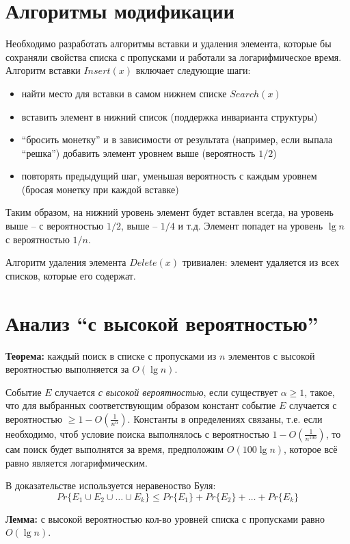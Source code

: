 \documentclass[11pt]{article}
\begin{document}
\section{Алгоритмы модификации}
Необходимо разработать алгоритмы вставки и удаления элемента, которые бы сохраняли свойства списка с пропусками и работали за логарифмическое время. Алгоритм вставки $Insert(x)$ включает следующие шаги:
\begin{itemize}
\item найти место для вставки в самом нижнем списке $Search(x)$
\item вставить элемент в нижний список (поддержка инварианта структуры)
\item ``бросить монетку'' и в зависимости от результата (например, если выпала ``решка'') добавить элемент уровнем выше (вероятность $1/2$)
\item повторять предыдущий шаг, уменьшая вероятность с каждым уровнем (бросая монетку при каждой вставке)
\end{itemize}
Таким образом, на нижний уровень элемент будет вставлен всегда, на уровень выше -- с вероятностью $1/2$, выше -- $1/4$ и т.д. Элемент попадет на уровень $\lg n$ с вероятностью $1/n$.

Алгоритм удаления элемента $Delete(x)$ тривиален: элемент удаляется из всех списков, которые его содержат.

\section{Анализ ``с высокой вероятностью''}
\textbf{Теорема:} каждый поиск в списке с пропусками из $n$ элементов с высокой вероятностью выполняется за $O(\lg n)$.

Событие $E$ случается \emph{с высокой вероятностью}, если существует $\alpha \geqslant 1$, такое, что для выбранных соответствующим образом констант событие $E$ случается с вероятностью $\geqslant 1 - O(\frac{1}{n^{\alpha}})$. Константы в определениях связаны, т.е. если необходимо, чтоб условие поиска выполнялось с вероятностью  $1 - O(\frac{1}{n^100})$, то сам поиск будет выполнятся за время, предположим $O(100 \lg n)$, которое всё равно является логарифмическим.

В доказательстве используется неравеноство Буля:
\begin{equation*}
  Pr\{E_1 \cup E_2 \cup \ldots \cup E_k\} \leqslant Pr\{E_1\} + Pr\{E_2\} + \ldots + Pr\{E_k\}
\end{equation*}

\textbf{Лемма:} с высокой вероятностью кол-во уровней списка с пропусками равно $O(\lg n)$. 
\end{document}
